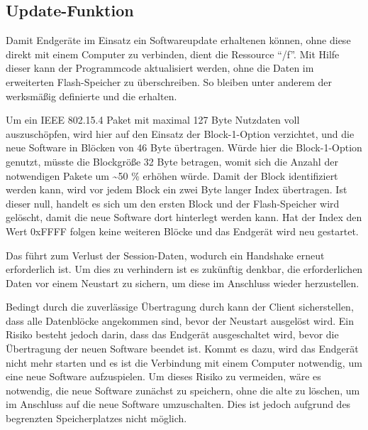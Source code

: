 \subsection{Update-Funktion}

Damit Endgeräte im Einsatz ein Softwareupdate erhaltenen können, ohne diese direkt mit einem Computer zu verbinden,
dient die Ressource "`/f"'. Mit Hilfe dieser kann der Programmcode aktualisiert werden, ohne die Daten im
erweiterten Flash-Speicher zu überschreiben. So bleiben unter anderem der werksmäßig definierte  und die  erhalten.

Um ein IEEE 802.15.4 Paket mit maximal 127 Byte Nutzdaten voll auszuschöpfen, wird hier auf den Einsatz der Block-1-Option verzichtet, und
die neue Software in Blöcken von 46 Byte übertragen. Würde hier die Block-1-Option genutzt, müsste die Blockgröße 32 Byte betragen, womit
sich die Anzahl der notwendigen Pakete um \textasciitilde 50 \% erhöhen würde. Damit der Block identifiziert werden kann, wird vor jedem Block ein zwei
Byte langer Index übertragen. Ist dieser null, handelt es sich um den ersten Block und der Flash-Speicher wird gelöscht, damit die neue Software
dort hinterlegt werden kann. Hat der Index den Wert $ 0 $xFFFF folgen keine weiteren Blöcke und das Endgerät wird neu gestartet.

Das führt zum Verlust der Session-Daten, wodurch ein Handshake erneut erforderlich ist. Um dies zu verhindern ist es zukünftig denkbar,
die erforderlichen Daten vor einem Neustart zu sichern, um diese im Anschluss wieder herzustellen.

Bedingt durch die zuverlässige Übertragung durch  kann der Client sicherstellen, dass alle Datenblöcke angekommen sind, bevor der Neustart ausgelöst wird.
Ein Risiko besteht jedoch darin, dass das Endgerät ausgeschaltet wird, bevor die Übertragung der neuen Software beendet ist. Kommt es dazu, wird das Endgerät
nicht mehr starten und es ist die Verbindung mit einem Computer notwendig, um eine neue Software aufzuspielen. Um dieses Risiko zu vermeiden, wäre es notwendig,
die neue Software zunächst zu speichern, ohne die alte zu löschen, um im Anschluss auf die neue Software umzuschalten. Dies ist jedoch aufgrund des begrenzten
Speicherplatzes nicht möglich.